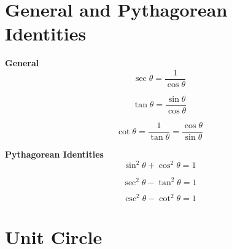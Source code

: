 \section{General and Pythagorean Identities}

\begin{minipage}{0.4\textwidth}
  \textbf{General}
  \begin{equation*}
    \sec \theta = \frac{1}{\cos \theta}
  \end{equation*}

  \begin{equation*}
    \tan \theta = \frac{\sin \theta}{\cos \theta}
  \end{equation*}

  \begin{equation*}
    \cot \theta = \frac{1}{\tan \theta} = \frac{\cos \theta}{\sin \theta}
  \end{equation*}
\vspace{0.5cm}
\end{minipage}
\begin{minipage}{0.3\textwidth}
  \textbf{Pythagorean Identities}
  \begin{equation*}
    \sin^2 \theta + \cos^2 \theta = 1
  \end{equation*}

  \begin{equation*}
    \sec^2 \theta - \tan^2 \theta = 1
  \end{equation*}

  \begin{equation*}
    \csc^2 \theta - \cot^2 \theta = 1
  \end{equation*}
\end{minipage}


\section{Unit Circle}

